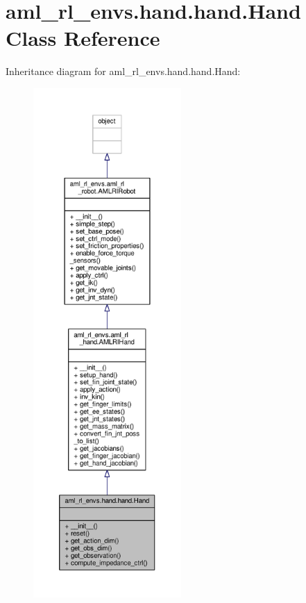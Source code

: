 \hypertarget{classaml__rl__envs_1_1hand_1_1hand_1_1_hand}{\section{aml\-\_\-rl\-\_\-envs.\-hand.\-hand.\-Hand Class Reference}
\label{classaml__rl__envs_1_1hand_1_1hand_1_1_hand}
}


Inheritance diagram for aml\-\_\-rl\-\_\-envs.\-hand.\-hand.\-Hand\-:
\nopagebreak
\begin{figure}[H]
\begin{center}
\leavevmode
\includegraphics[height=550pt]{classaml__rl__envs_1_1hand_1_1hand_1_1_hand__inherit__graph}
\end{center}
\end{figure}


